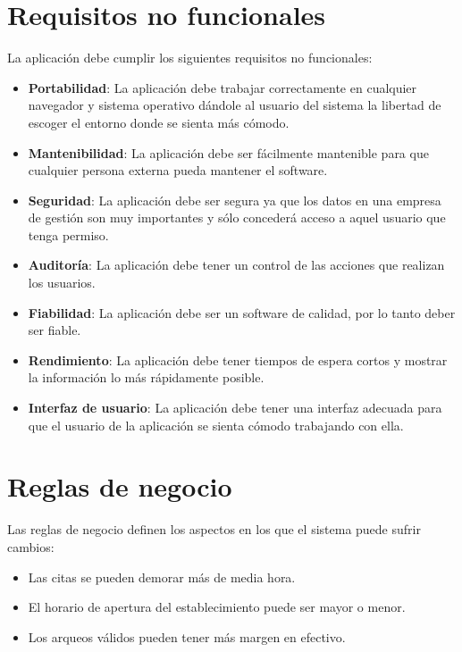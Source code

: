 \newpage
\section{Requisitos no funcionales}

La aplicación debe cumplir los siguientes requisitos no funcionales:

\begin{itemize}
\item \textbf{Portabilidad}: La aplicación debe trabajar correctamente en cualquier navegador y sistema operativo dándole al usuario del sistema la libertad de escoger el entorno donde se sienta más cómodo.
\item \textbf{Mantenibilidad}: La aplicación debe ser fácilmente mantenible para que cualquier persona externa pueda mantener el software.
\item \textbf{Seguridad}: La aplicación debe ser segura ya que los datos en una empresa de gestión son muy importantes y sólo concederá acceso a aquel usuario que tenga permiso.
\item \textbf{Auditoría}: La aplicación debe tener un control de las acciones que realizan los usuarios. 
\item \textbf{Fiabilidad}: La aplicación debe ser un software de calidad, por lo tanto deber ser fiable.
\item \textbf{Rendimiento}: La aplicación debe tener tiempos de espera cortos y mostrar la información lo más rápidamente posible.
\item \textbf{Interfaz de usuario}: La aplicación debe tener una interfaz adecuada para que el usuario de la aplicación se sienta cómodo trabajando con ella.
\end{itemize}

\section{Reglas de negocio}

Las reglas de negocio definen los aspectos en los que el sistema puede sufrir cambios:

\begin{itemize}
\item Las citas se pueden demorar más de media hora.
\item El horario de apertura del establecimiento puede ser mayor o menor.
\item Los arqueos válidos pueden tener más margen en efectivo.
\end{itemize}

